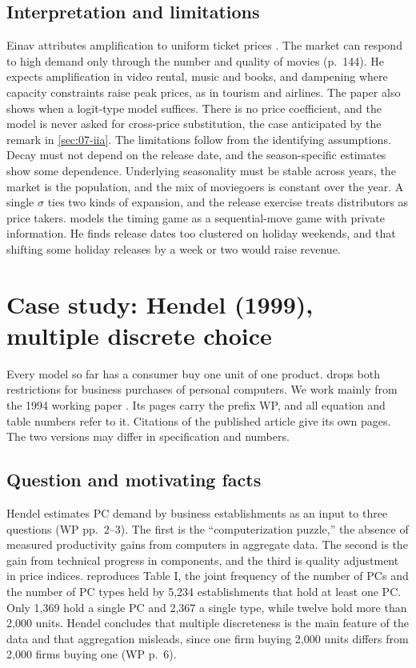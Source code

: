 \subsection{Interpretation and limitations}\label{sec:07-einav-assessment}

Einav attributes amplification to uniform ticket prices \citep{OrbachEinav2007}. The market can respond to high
demand only through the number and quality of movies (p.~144). He expects amplification in video rental, music
and books, and dampening where capacity constraints raise peak prices, as in tourism and airlines. The paper also
shows when a logit-type model suffices. There is no price coefficient, and the model is never asked for cross-price
substitution, the case anticipated by the remark in \cref{sec:07-iia}. The limitations follow from the identifying
assumptions. Decay must not depend on the release date, and the season-specific estimates show some dependence.
Underlying seasonality must be stable across years, the market is the population, and the mix of moviegoers is
constant over the year. A single $\sigma$ ties two kinds of expansion, and the release exercise treats
distributors as price takers. \citet{Einav2010} models the timing game as a sequential-move game with private
information. He finds release dates too clustered on holiday weekends, and that shifting some holiday releases by
a week or two would raise revenue.

\section{Case study: Hendel (1999), multiple discrete choice}\label{sec:07-hendel}

Every model so far has a consumer buy one unit of one product. \citet{Hendel1999} drops both restrictions for
business purchases of personal computers. We work mainly from the 1994 working paper \citep{Hendel1994}. Its pages
carry the prefix WP, and all equation and table numbers refer to it. Citations of the published article give its
own pages. The two versions may differ in specification and numbers.

\subsection{Question and motivating facts}\label{sec:07-hendel-question}

Hendel estimates PC demand by business establishments as an input to three questions (WP pp.~2--3). The first
is the ``computerization puzzle,'' the absence of measured productivity gains from computers in aggregate data.
The second is the gain from technical progress in components, and the third is quality adjustment in price
indices. 
reproduces Table I, the joint frequency of the number of PCs and the number of PC types held by 5,234
establishments that hold at least one PC. Only 1,369 hold a single PC and 2,367 a single type, while twelve hold
more than 2,000 units. Hendel concludes that multiple discreteness is the main feature of the data and that
aggregation misleads, since one firm buying 2,000 units differs from 2,000 firms buying one (WP p.~6).

